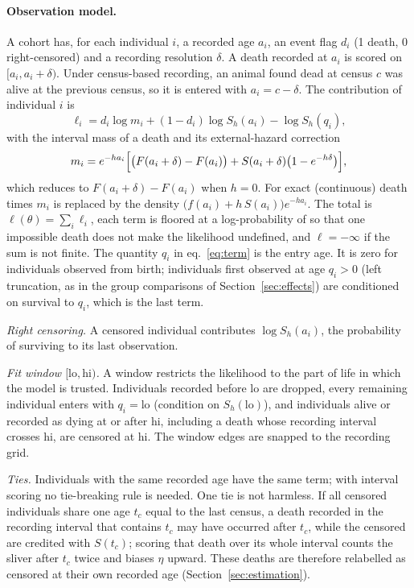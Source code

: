 \paragraph{Observation model.} A cohort has, for each individual $i$, a recorded age $a_i$, an event flag $d_i$ (1
death, 0 right-censored) and a recording resolution $\delta$. A death recorded at $a_i$ is scored on $[a_i,a_i+\delta)$.
Under census-based recording, an animal found dead at census $c$ was alive at the previous census, so it is entered
with $a_i=c-\delta$. The contribution of individual $i$ is
\begin{equation}\label{eq:term}
  \ell_i=d_i\log m_i+(1-d_i)\log S_h(a_i)-\log S_h(q_i),
\end{equation}
with the interval mass of a death and its external-hazard correction
\begin{equation}\label{eq:mass}
  m_i=e^{-h a_i}\Bigl[\bigl(F(a_i+\delta)-F(a_i)\bigr)+S(a_i+\delta)\bigl(1-e^{-h\delta}\bigr)\Bigr],
\end{equation}
which reduces to $F(a_i+\delta)-F(a_i)$ when $h=0$. For exact (continuous) death times $m_i$ is replaced by the density
$\bigl(f(a_i)+h\,S(a_i)\bigr)e^{-h a_i}$. The total is $\ell(\theta)=\sum_i\ell_i$, each term is floored at a log-probability of
 so that one impossible death does not make the likelihood undefined, and $\ell=-\infty$ if the sum is
not finite. The quantity $q_i$ in eq.~\eqref{eq:term} is the entry age. It is zero
for individuals observed from birth; individuals first observed at age $q_i>0$ (left truncation, as in the group
comparisons of Section~\ref{sec:effects}) are conditioned on survival to $q_i$, which is the last term.

\emph{Right censoring.} A censored individual contributes $\log S_h(a_i)$, the probability of surviving to its last
observation.

\emph{Fit window $[\mathrm{lo},\mathrm{hi})$.} A window restricts the likelihood to the part of life in which the model is
trusted. Individuals recorded before $\mathrm{lo}$ are dropped, every remaining individual enters with $q_i=\mathrm{lo}$
(condition on $S_h(\mathrm{lo})$), and individuals alive or recorded as dying at or after $\mathrm{hi}$, including a death
whose recording interval crosses $\mathrm{hi}$, are censored at $\mathrm{hi}$. The window edges are snapped to the
recording grid.

\emph{Ties.} Individuals with the same recorded age have the same term; with interval scoring no tie-breaking rule is
needed. One tie is not harmless. If all censored individuals share one age $t_c$ equal to the last census, a death
recorded in the recording interval that contains $t_c$ may have occurred after $t_c$, while the censored are credited
with $S(t_c)$; scoring that death over its whole interval counts the sliver after $t_c$ twice and biases $\eta$ upward.
These deaths are therefore relabelled as censored at their own recorded age (Section~\ref{sec:estimation}).

